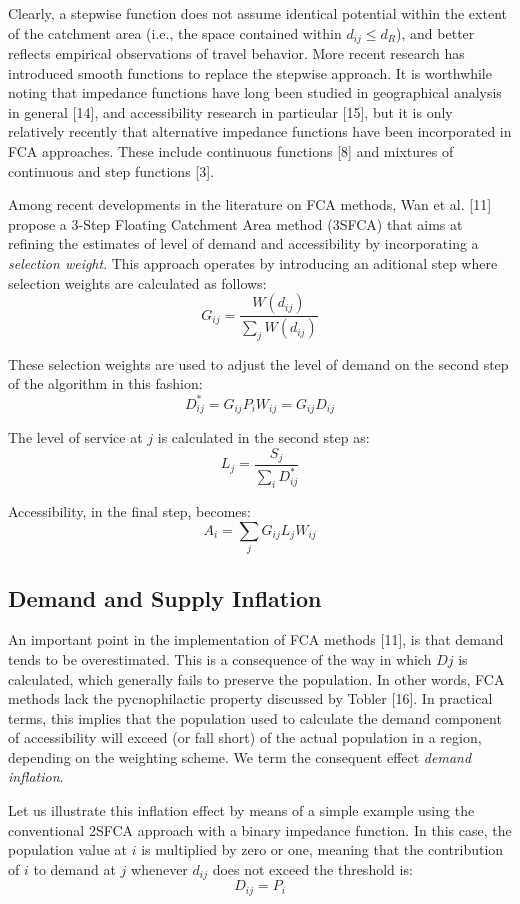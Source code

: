 \documentclass[10pt,letterpaper]{article}
\begin{document}
Clearly, a stepwise function does not assume identical potential within
the extent of the catchment area (i.e., the space contained within
\(d_{ij} \leq d_R\)), and better reflects empirical observations of
travel behavior. More recent research has introduced smooth functions to
replace the stepwise approach. It is worthwhile noting that impedance
functions have long been studied in geographical analysis in general
{[}14{]}, and accessibility research in particular {[}15{]}, but it is
only relatively recently that alternative impedance functions have been
incorporated in FCA approaches. These include continuous functions
{[}8{]} and mixtures of continuous and step functions {[}3{]}.

Among recent developments in the literature on FCA methods, Wan et al.
{[}11{]} propose a 3-Step Floating Catchment Area method (3SFCA) that
aims at refining the estimates of level of demand and accessibility by
incorporating a \emph{selection weight}. This approach operates by
introducing an aditional step where selection weights are calculated as
follows: \[
G_{ij}=\frac{W(d_{ij})}{\sum_jW(d_{ij})}
\]

These selection weights are used to adjust the level of demand on the
second step of the algorithm in this fashion: \[
D^*_{ij} = G_{ij}P_iW_{ij} = G_{ij}D_{ij}
\]

The level of service at \(j\) is calculated in the second step as: \[
L_j=\frac{S_j}{\sum_iD^*_{ij}}
\]

Accessibility, in the final step, becomes: \[
A_i = \sum_jG_{ij}L_jW_{ij}
\]

\subsection{Demand and Supply
Inflation}\label{demand-and-supply-inflation}

An important point in the implementation of FCA methods {[}11{]}, is
that demand tends to be overestimated. This is a consequence of the way
in which \(Dj\) is calculated, which generally fails to preserve the
population. In other words, FCA methods lack the pycnophilactic property
discussed by Tobler {[}16{]}. In practical terms, this implies that the
population used to calculate the demand component of accessibility will
exceed (or fall short) of the actual population in a region, depending
on the weighting scheme. We term the consequent effect \emph{demand
inflation}.

Let us illustrate this inflation effect by means of a simple example
using the conventional 2SFCA approach with a binary impedance function.
In this case, the population value at \(i\) is multiplied by zero or
one, meaning that the contribution of \(i\) to demand at \(j\) whenever
\(d_{ij}\) does not exceed the threshold is: \[
D_{ij} = P_i
\]
\end{document}

